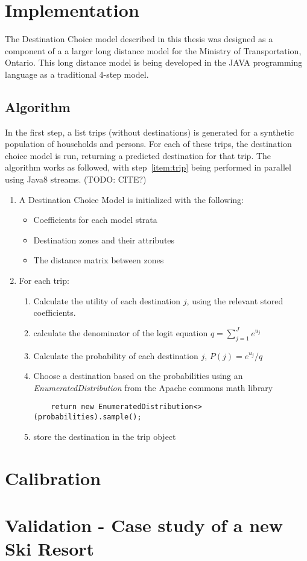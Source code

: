 \section{Implementation}
\label{section:implementation}
The Destination Choice model described in this thesis was designed as a component of a a larger long distance model for the Ministry of Transportation, Ontario. This long distance model is being developed in the JAVA programming language as a traditional 4-step model. 

\subsection{Algorithm}
In the first step, a list trips (without destinations) is generated for a synthetic population of households and persons. For each of these trips, the destination choice model is run, returning a predicted destination for that trip. The algorithm works as followed, with step~\ref{item:trip} being performed in parallel using Java8 streams. (TODO: CITE?)
\begin{enumerate}
\item A Destination Choice Model is initialized with the following:
	\begin{itemize}
	\item Coefficients for each model strata
	\item Destination zones and their attributes
	\item The distance matrix between zones
	\end{itemize}
\item \label{item:trip} For each trip:
	\begin{enumerate}
	\item Calculate the utility of each destination $j$, using the relevant stored coefficients.
	\item \label{item:denom} calculate the denominator of the logit equation $q = {\sum_{j=1}^{J} e^{u_j}}
	$
	\item Calculate the probability of each destination $j$, $P(j) = e^{u_j} / q $
	\item Choose a destination based on the probabilities using an \textit{EnumeratedDistribution} from the Apache commons math library 
	\begin{verbatim}
	return new EnumeratedDistribution<>(probabilities).sample();
	\end{verbatim}

	\item store the destination in the trip object
	\end{enumerate}
\end{enumerate}

\section{Calibration}

\section{Validation - Case study of a new Ski Resort}